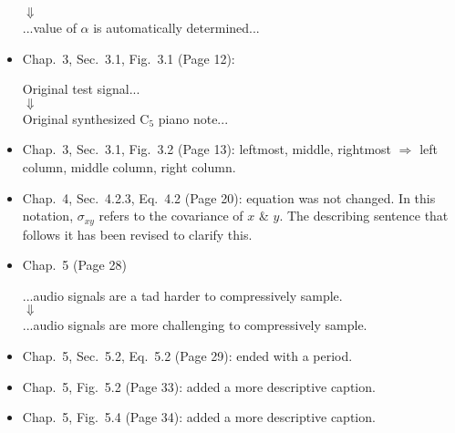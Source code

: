 \documentclass{report}
\begin{document}
\begin{itemize}
\begin{center}
				$\Downarrow$ \\
				...value of $\alpha$ is automatically determined...
			\end{center}
		\item Chap.~3, Sec.~3.1, Fig.~3.1 (Page 12):
			\begin{center}
				Original test signal... \\
				$\Downarrow$ \\
				Original synthesized C$_5$ piano note...
			\end{center}
		\item Chap.~3, Sec.~3.1, Fig.~3.2 (Page 13): leftmost, middle, rightmost $\Rightarrow$ left column, middle column, right column.
		\item Chap.~4, Sec.~4.2.3, Eq.~4.2 (Page 20): equation was not changed. In this notation, $\sigma_{xy}$ refers to the covariance of $x$ \& $y$. The describing sentence that follows it has been revised to clarify this.
		\item Chap.~5 (Page 28)
			\begin{center}
				...audio signals are a tad harder to compressively sample. \\
				$\Downarrow$ \\
				...audio signals are more challenging to compressively sample.
			\end{center}
		\item Chap.~5, Sec.~5.2, Eq.~5.2 (Page 29): ended with a period.
		\item Chap.~5, Fig.~5.2 (Page 33): added a more descriptive caption.
		\item Chap.~5, Fig.~5.4 (Page 34): added a more descriptive caption.
	\end{itemize}
\end{document}
